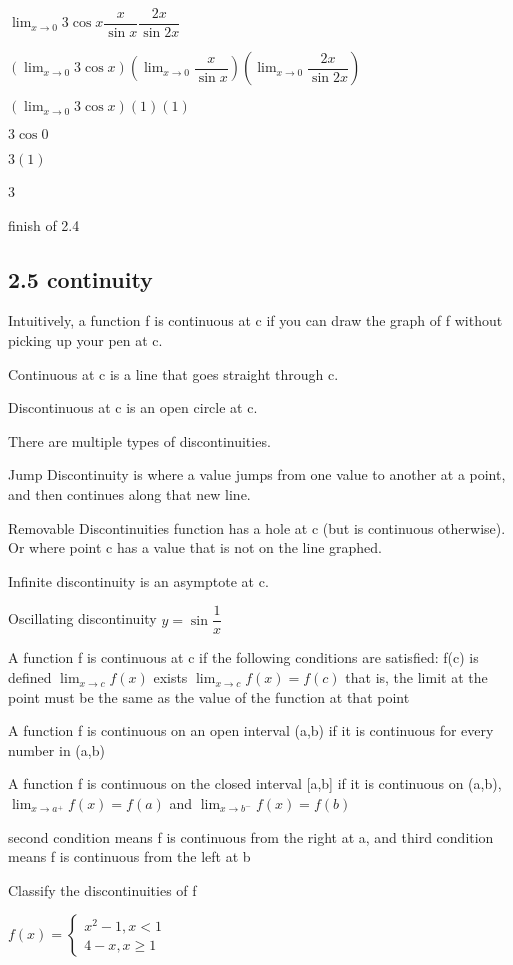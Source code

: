 \documentclass[12pt]{article}
\begin{document}
$\lim_{x \to 0} 3\cos x \dfrac{x}{\sin x} \dfrac{2x}{\sin 2x}$

$(\lim_{x \to 0} 3\cos x)(\lim_{x \to 0} \dfrac{x}{\sin x})(\lim_{x \to 0} \dfrac{2x}{\sin 2x})$

$(\lim_{x \to 0} 3\cos x)(1)(1)$

$3 \cos 0$

$3(1)$

3

finish of 2.4

\subsection{2.5 continuity}

Intuitively, a function f is continuous at c if you can draw the graph of f without picking up your pen at c.

Continuous at c is a line that goes straight through c.

Discontinuous at c is an open circle at c.

There are multiple types of discontinuities.

Jump Discontinuity is where a value jumps from one value to another at a point, and then continues along that
new line.

Removable Discontinuities function has a hole at c (but is continuous otherwise).
Or where point c has a value that is not on the line graphed.

Infinite discontinuity is an asymptote at c.

Oscillating discontinuity $y = \sin\dfrac{1}{x}$

A function f is continuous at c if the following conditions are satisfied:
f(c) is defined
$\lim_{x \to c}f(x)$ exists
$\lim_{x \to c}f(x) = f(c)$ that is, the limit at the point must be the same as the value of the function at
that point

A function f is continuous on an open interval (a,b) if it is continuous for every number in (a,b)

A function f is continuous on the closed interval [a,b] if it is continuous on (a,b),$\lim_{x \to a^+}f(x) =
f(a)$ and $\lim_{x \to b^-}f(x) = f(b)$

second condition means f is continuous from the right at a, and third condition means f is continuous from the
left at b

Classify the discontinuities of f

$f(x) = \left\{\begin{array}{l}
x^2-1,x < 1\\
4-x, x \geq 1
\end{array} \right. $
\end{document}
